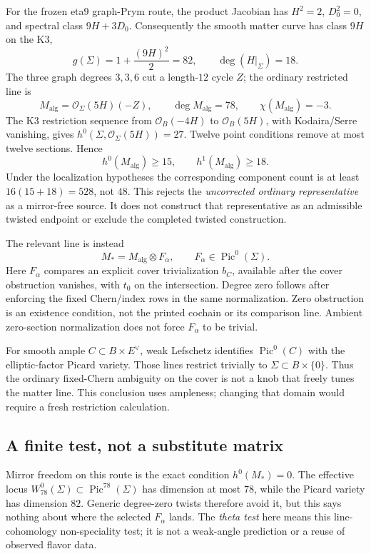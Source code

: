 \documentclass[11pt,a4paper]{article}
\begin{document}
For the frozen eta9 graph-Prym route, the product Jacobian has
\(H^2=2\), \(D_0^2=0\), and spectral class \(9H+3D_0\).
Consequently the smooth matter curve has class \(9H\) on the K3,
\[
 g(\Sigma)=1+\frac{(9H)^2}{2}=82,\qquad \deg(H|_\Sigma)=18.
\]
The three graph degrees \(3,3,6\) cut a length-\(12\) cycle \(Z\);
the ordinary restricted line is
\[
 M_{\mathrm{alg}}=\mathcal O_\Sigma(5H)(-Z),\qquad
 \deg M_{\mathrm{alg}}=78,\qquad \chi(M_{\mathrm{alg}})=-3.
\]
The K3 restriction sequence from \(\mathcal O_B(-4H)\) to
\(\mathcal O_B(5H)\), with Kodaira/Serre vanishing, gives
\(h^0(\Sigma,\mathcal O_\Sigma(5H))=27\).
Twelve point conditions remove at most twelve sections. Hence
\[
 h^0(M_{\mathrm{alg}})\geq15,\qquad
 h^1(M_{\mathrm{alg}})\geq18.
\]
Under the localization hypotheses the corresponding component count
is at least \(16(15+18)=528\), not \(48\). This rejects the
\emph{uncorrected ordinary representative} as a mirror-free source.
It does not construct that representative as an admissible twisted
endpoint or exclude the completed twisted construction.

The relevant line is instead
\[
 M_\ast=M_{\mathrm{alg}}\otimes F_\alpha,\qquad
 F_\alpha\in\operatorname{Pic}^0(\Sigma).
\]
Here \(F_\alpha\) compares an explicit cover trivialization \(b_C\),
available after the cover obstruction vanishes, with \(t_0\) on
the intersection. Degree zero follows after enforcing the fixed
Chern/index rows in the same normalization. Zero obstruction is an
existence condition, not the printed cochain or its comparison line.
Ambient zero-section normalization does not force \(F_\alpha\) to be
trivial.

For smooth ample \(C\subset B\times E^\vee\), weak Lefschetz identifies
\(\operatorname{Pic}^0(C)\) with the elliptic-factor Picard variety.
Those lines restrict trivially to \(\Sigma\subset B\times\{0\}\).
Thus the ordinary fixed-Chern ambiguity on the cover is not a knob
that freely tunes the matter line. This conclusion uses ampleness;
changing that domain would require a fresh restriction calculation.

\subsection{A finite test, not a substitute matrix}
\label{sec:matter-theta-test}

Mirror freedom on this route is the exact condition \(h^0(M_\ast)=0\).
The effective locus \(W^0_{78}(\Sigma)\subset\operatorname{Pic}^{78}(\Sigma)\)
has dimension at most \(78\), while the Picard variety has dimension \(82\).
Generic degree-zero twists therefore avoid it, but this says nothing
about where the selected \(F_\alpha\) lands. The \emph{theta test} here
means this line-cohomology non-speciality test; it is not a weak-angle
prediction or a reuse of observed flavor data.
\end{document}
